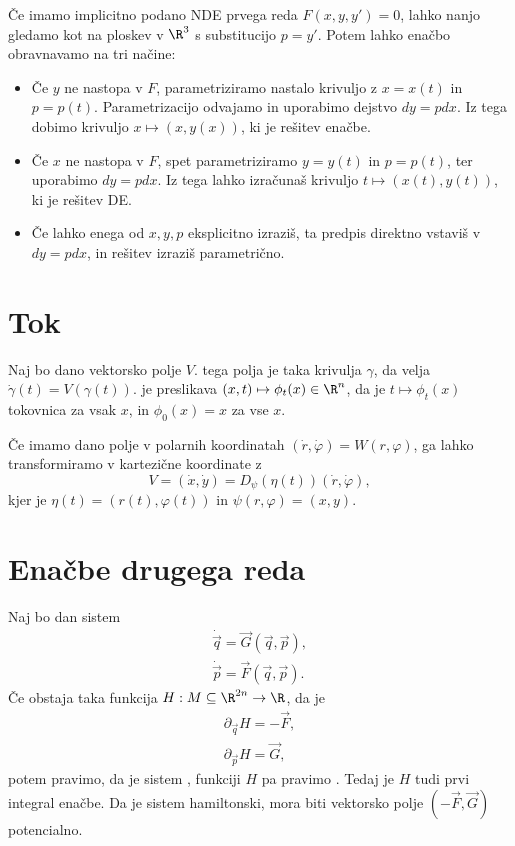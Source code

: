 Če imamo implicitno podano NDE prvega reda $F(x, y, y') = 0$, lahko nanjo
gledamo kot na ploskev v $\R^3$ s substitucijo $p = y'$.
Potem lahko enačbo obravnavamo na tri načine:
\begin{itemize}
\item Če $y$ ne nastopa v $F$, parametriziramo nastalo krivuljo z $x = x(t)$ in
  $p = p(t)$.
  Parametrizacijo odvajamo in uporabimo dejstvo $dy = p dx$.
  Iz tega dobimo krivuljo $x \mapsto (x, y(x))$, ki je rešitev enačbe.
\item Če $x$ ne nastopa v $F$, spet parametriziramo $y = y(t)$ in $p = p(t)$,
  ter uporabimo $dy = p dx$.
  Iz tega lahko izračunaš krivuljo $t \mapsto (x(t), y(t))$, ki je rešitev DE\@.
\item Če lahko enega od $x, y, p$ eksplicitno izraziš, ta predpis direktno
  vstaviš v $dy = p dx$, in rešitev izraziš parametrično.
\end{itemize}

\section{Tok}

Naj bo dano vektorsko polje $V$.
 tega polja je taka krivulja $\gamma$, da velja
$\dot{\gamma}(t) = V(\gamma(t))$.
 je preslikava $(x, t) \mapsto \phi_t(x) \in \R^n$, da je $t \mapsto
\phi_t(x)$ tokovnica za vsak $x$, in $\phi_0(x) = x$ za vse $x$.

Če imamo dano polje v polarnih koordinatah $(\dot{r}, \dot{\varphi}) = W(r,
\varphi)$, ga lahko transformiramo v kartezične koordinate z
\[
  V = (\dot{x}, \dot{y}) = D_\psi (\eta(t)) (\dot{r}, \dot{\varphi}),
\]
kjer je $\eta(t) = (r(t), \varphi(t))$ in $\psi(r, \varphi) = (x, y)$.

\section{Enačbe drugega reda}

Naj bo dan sistem
\begin{gather*}
  \dot{\vec{q}} = \vec{G}(\vec{q}, \vec{p}), \\
  \dot{\vec{p}} = \vec{F}(\vec{q}, \vec{p}).
\end{gather*}
Če obstaja taka funkcija $H: M \subseteq \R^{2n} \to \R$, da je
\begin{gather*}
  \partial_{\vec{q}} H = -\vec{F}, \\
  \partial_{\vec{p}} H = \vec{G},
\end{gather*}
potem pravimo, da je sistem , funkciji $H$ pa pravimo
.
Tedaj je $H$ tudi prvi integral enačbe.
Da je sistem hamiltonski, mora biti vektorsko polje $(-\vec{F}, \vec{G})$
potencialno.

